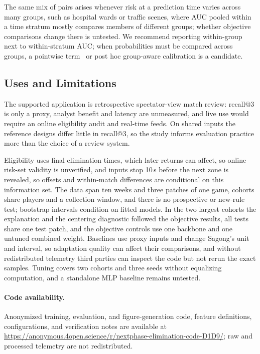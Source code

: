 \documentclass[sigconf,anonymous]{acmart}
\newcommand{\artifacturl}{\url{https://anonymous.4open.science/r/nextphase-elimination-code-D1D9/}}
\begin{document}
The same mix of pairs arises whenever risk at a prediction time varies across many groups, such as hospital wards or traffic scenes, where AUC pooled within a time stratum mostly compares members of different groups; whether objective comparisons change there is untested. We recommend reporting within-group next to within-stratum AUC; when probabilities must be compared across groups, a pointwise term~\cite{Bai23} or post hoc group-aware calibration is a candidate.

\subsection{Uses and Limitations}
\label{sec:discussion:limits}
The supported application is retrospective spectator-view match review: recall@3 is only a proxy, analyst benefit and latency are unmeasured, and live use would require an online eligibility audit and real-time feeds. On shared inputs the reference designs differ little in recall@3, so the study informs evaluation practice more than the choice of a review system.

Eligibility uses final elimination times, which later returns can affect, so online risk-set validity is unverified, and inputs stop 10\,s before the next zone is revealed, so offsets and within-match differences are conditional on this information set. The data span ten weeks and three patches of one game, cohorts share players and a collection window, and there is no prospective or new-rule test; bootstrap intervals condition on fitted models. In the two largest cohorts the explanation and the centering diagnostic followed the objective results, all tests share one test patch, and the objective controls use one backbone and one untuned combined weight. Baselines use proxy inputs and change Sagong's unit and interval, so adaptation quality can affect their comparisons, and without redistributed telemetry third parties can inspect the code but not rerun the exact samples. Tuning covers two cohorts and three seeds without equalizing computation, and a standalone MLP baseline remains untested.

\paragraph{Code availability.}
Anonymized training, evaluation, and figure-generation code, feature definitions, configurations, and verification notes are available at \artifacturl{}; raw and processed telemetry are not redistributed.
\end{document}
